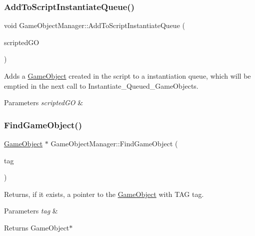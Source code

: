 \subsubsection{\texorpdfstring{Add\+To\+Script\+Instantiate\+Queue()}{AddToScriptInstantiateQueue()}}
{\footnotesize\ttfamily void Game\+Object\+Manager\+::\+Add\+To\+Script\+Instantiate\+Queue (\begin{DoxyParamCaption}\item[{\hyperlink{classGameObject}{Game\+Object} $\ast$}]{scripted\+GO }\end{DoxyParamCaption})}



Adds a \hyperlink{classGameObject}{Game\+Object} created in the script to a instantiation queue, which will be emptied in the next call to Instantiate\+\_\+\+Queued\+\_\+\+Game\+Objects. 


\begin{DoxyParams}{Parameters}
{\em scripted\+GO} & \\
\hline
\end{DoxyParams}
\mbox{\label{classGameObjectManager_adeda63433f7f441ad4d48fc4b9758444}} 
\subsubsection{\texorpdfstring{Find\+Game\+Object()}{FindGameObject()}}
{\footnotesize\ttfamily \hyperlink{classGameObject}{Game\+Object} $\ast$ Game\+Object\+Manager\+::\+Find\+Game\+Object (\begin{DoxyParamCaption}\item[{std\+::string const \&}]{tag }\end{DoxyParamCaption})}



Returns, if it exists, a pointer to the \hyperlink{classGameObject}{Game\+Object} with T\+AG tag. 


\begin{DoxyParams}{Parameters}
{\em tag} & \\
\hline
\end{DoxyParams}
\begin{DoxyReturn}{Returns}
Game\+Object$\ast$ 
\end{DoxyReturn}
\mbox{\label{classGameObjectManager_a7507d2f3f5628774a47528705cf9ed49}} 
